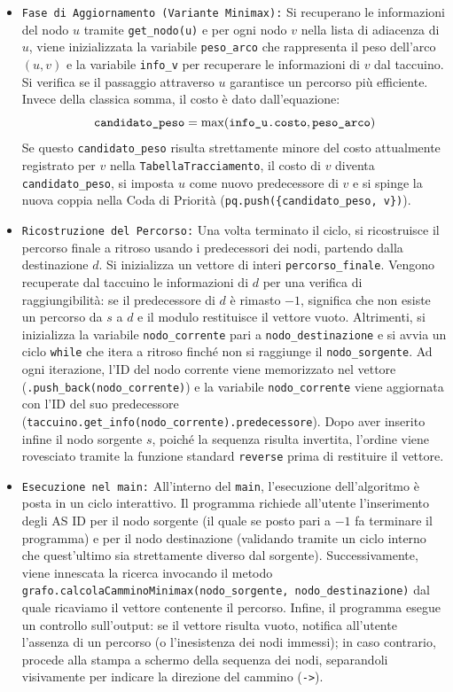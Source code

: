 \documentclass[12pt, a4paper]{article}
\begin{document}
\begin{enumerate}
\begin{itemize}
        \item[-] \texttt{Fase di Aggiornamento (Variante Minimax):} Si recuperano le informazioni del nodo $u$ tramite \texttt{get\_nodo(u)} e per ogni nodo $v$ nella lista di adiacenza di $u$, viene inizializzata la variabile \texttt{peso\_arco} che rappresenta il peso dell'arco $(u,v)$ e la variabile \texttt{info\_v} per recuperare le informazioni di $v$ dal taccuino. Si verifica se il passaggio attraverso $u$ garantisce un percorso più efficiente. Invece della classica somma, il costo è dato dall'equazione: 
        \begin{equation}
            \mbox{\texttt{candidato\_peso}} = \max(\mbox{\texttt{info\_u.costo}}, \mbox{\texttt{peso\_arco}})
        \end{equation}
        Se questo \texttt{candidato\_peso} risulta strettamente minore del costo attualmente registrato per $v$ nella \texttt{TabellaTracciamento}, il costo di $v$ diventa \texttt{candidato\_peso}, si imposta $u$ come nuovo predecessore di $v$ e si spinge la nuova coppia nella Coda di Priorità (\texttt{pq.push(\{candidato\_peso, v\})}).
        \item[-] \texttt{Ricostruzione del Percorso:} Una volta terminato il ciclo, si ricostruisce il percorso finale a ritroso usando i predecessori dei nodi, partendo dalla destinazione $d$. Si inizializza un vettore di interi \texttt{percorso\_finale}. Vengono recuperate dal taccuino le informazioni di $d$ per una verifica di raggiungibilità: se il predecessore di $d$ è rimasto $-1$, significa che non esiste un percorso da $s$ a $d$ e il modulo restituisce il vettore vuoto. Altrimenti, si inizializza la variabile \texttt{nodo\_corrente} pari a \texttt{nodo\_destinazione} e si avvia un ciclo \texttt{while} che itera a ritroso finché non si raggiunge il \texttt{nodo\_sorgente}. Ad ogni iterazione, l'ID del nodo corrente viene memorizzato nel vettore (\texttt{.push\_back(nodo\_corrente)}) e la variabile \texttt{nodo\_corrente} viene aggiornata con l'ID del suo predecessore \\(\texttt{taccuino.get\_info(nodo\_corrente).predecessore}). Dopo aver inserito infine il nodo sorgente $s$, poiché la sequenza risulta invertita, l'ordine viene rovesciato tramite la funzione standard \texttt{reverse} prima di restituire il vettore.
        \item[-] \texttt{Esecuzione nel \texttt{main}:} All'interno del \texttt{main}, l'esecuzione dell'algoritmo è posta in un ciclo interattivo. Il programma richiede all'utente l'inserimento degli AS ID per il nodo sorgente (il quale se posto pari a $-1$ fa terminare il programma) e per il nodo destinazione (validando tramite un ciclo interno che quest'ultimo sia strettamente diverso dal sorgente). Successivamente, viene innescata la ricerca invocando il metodo \texttt{grafo.calcolaCamminoMinimax(nodo\_sorgente, nodo\_destinazione)} dal quale ricaviamo il vettore contenente il percorso. Infine, il programma esegue un controllo sull'output: se il vettore risulta vuoto, notifica all'utente l'assenza di un percorso (o l'inesistenza dei nodi immessi); in caso contrario, procede alla stampa a schermo della sequenza dei nodi, separandoli visivamente per indicare la direzione del cammino (\texttt{->}).

\end{itemize}
\end{enumerate}
\end{document}
